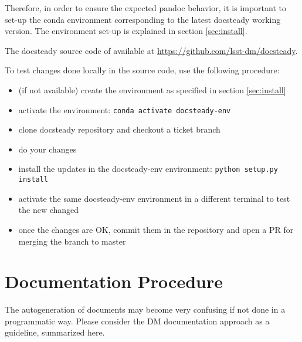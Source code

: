 \documentclass[DM]{lsstdoc}
\begin{document}
Therefore, in order to ensure the expected pandoc behavior, it is important to set-up the conda environment corresponding to the latest docsteady working version.
The environment set-up is explained in section \ref{sec:install}.

The docsteady source code of available at \url{https://github.com/lsst-dm/docsteady}.

To test changes done locally in the source code, use the following procedure:

\begin{itemize}
\item (if not available) create the environment as specified in section \ref{sec:install}
\item activate the environment: \texttt{conda activate docsteady-env}
\item clone docsteady repository and checkout a ticket branch
\item do your changes
\item install the updates in the docsteady-env environment: \texttt{python setup.py install}
\item activate the same docsteady-env environment in a different terminal to test the new changed
\item once the changes are OK, commit them in the repository and open a PR for merging the branch to master
\end{itemize}



\section{Documentation Procedure}
\label{sec:docproc}

The autogeneration of documents may become very confusing if not done in a programmatic way.
Please consider the DM documentation approach as a guideline, summarized here.
\end{document}
